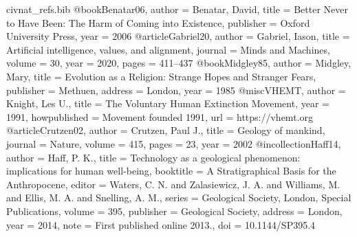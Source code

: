 \begin{filecontents}[overwrite]{civnat_refs.bib}
@book{Benatar06,
  author    = {Benatar, David},
  title     = {Better Never to Have Been: The Harm of Coming into Existence},
  publisher = {Oxford University Press},
  year      = {2006}
}
@article{Gabriel20,
  author  = {Gabriel, Iason},
  title   = {Artificial intelligence, values, and alignment},
  journal = {Minds and Machines},
  volume  = {30},
  year    = {2020},
  pages   = {411--437}
}
@book{Midgley85,
  author    = {Midgley, Mary},
  title     = {Evolution as a Religion: Strange Hopes and Stranger Fears},
  publisher = {Methuen},
  address   = {London},
  year      = {1985}
}
@misc{VHEMT,
  author       = {Knight, Les U.},
  title        = {The Voluntary Human Extinction Movement},
  year         = {1991},
  howpublished = {Movement founded 1991},
  url          = {https://vhemt.org}
}
@article{Crutzen02,
  author  = {Crutzen, Paul J.},
  title   = {Geology of mankind},
  journal = {Nature},
  volume  = {415},
  pages   = {23},
  year    = {2002}
}
@incollection{Haff14,
  author    = {Haff, P. K.},
  title     = {Technology as a geological phenomenon: implications for human well-being},
  booktitle = {A Stratigraphical Basis for the Anthropocene},
  editor    = {Waters, C. N. and Zalasiewicz, J. A. and Williams, M. and Ellis, M. A. and Snelling, A. M.},
  series    = {Geological Society, London, Special Publications},
  volume    = {395},
  publisher = {Geological Society},
  address   = {London},
  year      = {2014},
  note      = {First published online 2013.},
  doi       = {10.1144/SP395.4}
}
\end{filecontents}
\documentclass[11pt]{article}
\usepackage[margin=1.1in]{geometry}
\usepackage{amsmath,amssymb,amsthm,mathtools}
\usepackage{booktabs,graphicx,enumitem,url,xcolor}
\usepackage[colorlinks=true,linkcolor=blue!50!black,citecolor=blue!50!black,urlcolor=blue!50!black]{hyperref}
\usepackage[style=numeric, sorting=none]{biblatex}



\renewcommand*{\bibfont}{\small}
\newcommand{\E}{\mathbb{E}}
\newcommand{\PP}{\mathbb{P}}
\newcommand{\Mc}{\mathcal{M}}
\newcommand{\R}{\mathbb{R}}
\DeclareMathOperator{\Var}{Var}
\DeclareMathOperator{\Cov}{Cov}
